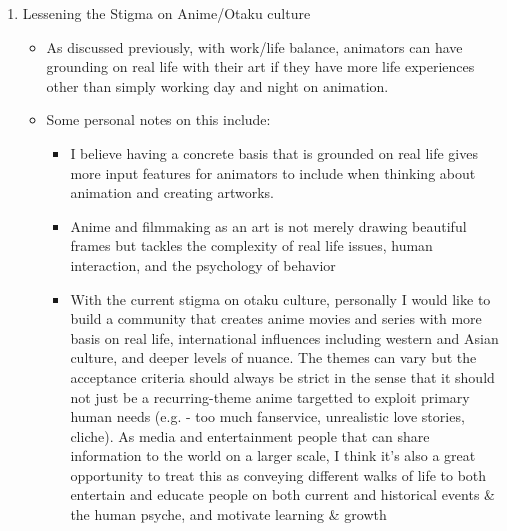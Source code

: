\begin{enumerate}
    \item Lessening the Stigma on Anime/Otaku culture
    \begin{itemize}
        \item As discussed previously, with work/life balance, animators can have grounding on real life with their art if they have more life experiences other than simply working day and night on animation.
        \item Some personal notes on this include:
        \begin{itemize}
            \item I believe having a concrete basis that is grounded on real life gives more input features for animators to include when thinking about animation and creating artworks.
            \item Anime and filmmaking as an art is not merely drawing beautiful frames but tackles the complexity of real life issues, human interaction, and the psychology of behavior
            \item With the current stigma on otaku culture, personally I would like to build a community that creates anime movies and series with more basis on real life, international influences including western and Asian culture, and deeper levels of nuance. The themes can vary but the acceptance criteria should always be strict in the sense that it should not just be a recurring-theme anime targetted to exploit primary human needs (e.g. - too much fanservice, unrealistic love stories, cliche). As media and entertainment people that can share information to the world on a larger scale, I think it's also a great opportunity to treat this as conveying different walks of life to both entertain and educate people on both current and historical events \& the human psyche, and motivate learning \& growth
        \end{itemize}
    \end{itemize}
\end{enumerate}